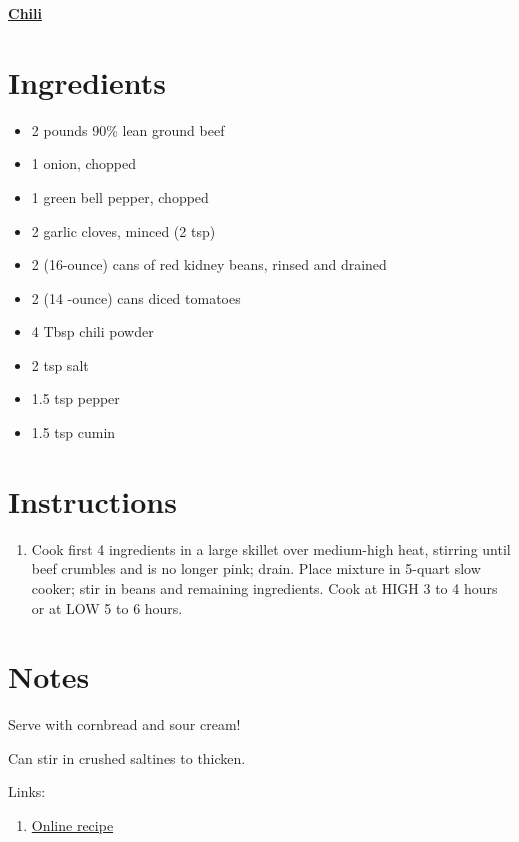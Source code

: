 \documentclass[11pt]{article}
\begin{document}
	\begin{center}\begin{huge}\underline{\textbf{Chili}}\end{huge}\end{center}

	\section*{Ingredients}
	\begin{itemize}
		\item 2 pounds 90\% lean ground beef
		\item 1 onion, chopped
		\item 1 green bell pepper, chopped
		\item 2 garlic cloves, minced (2 tsp)
		\item 2 (16-ounce) cans of red kidney beans, rinsed and drained
		\item 2 (14 -ounce) cans diced tomatoes
		\item 4 Tbsp chili powder
		\item 2 tsp salt
		\item 1.5 tsp pepper
		\item 1.5 tsp cumin
	\end{itemize}
	
	\section*{Instructions}
	\begin{enumerate}
		\item Cook first 4 ingredients in a large skillet over medium-high heat, stirring until beef crumbles and is no longer pink; drain. Place mixture in 5-quart slow cooker; stir in beans and remaining ingredients. Cook at HIGH 3 to 4 hours or at LOW 5 to 6 hours.
	\end{enumerate}
	
	\section*{Notes}
	Serve with cornbread and sour cream!
	
	Can stir in crushed saltines to thicken.
	
	Links:
	\begin{enumerate}
		\item \href{https://www.myrecipes.com/recipe/easy-chili}{Online recipe}
	\end{enumerate}
	
\end{document}
